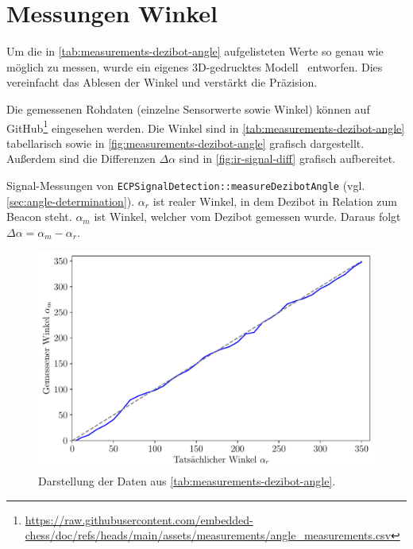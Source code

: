 
\section{Messungen Winkel}
\label{sec:measurements-dezibot-angle}

Um die in \autoref{tab:measurements-dezibot-angle} aufgelisteten Werte so genau wie möglich zu messen, wurde ein eigenes 3D\hyphen gedrucktes Modell~\cite{felttipDezibotAlignmentPointer2025} entworfen. Dies vereinfacht das Ablesen der Winkel und verstärkt die Präzision.

Die gemessenen Rohdaten (einzelne Sensorwerte sowie Winkel) können auf GitHub\footnote{\url{https://raw.githubusercontent.com/embedded-chess/doc/refs/heads/main/assets/measurements/angle_measurements.csv}} eingesehen werden. Die Winkel sind in \autoref{tab:measurements-dezibot-angle} tabellarisch sowie in \autoref{fig:measurements-dezibot-angle} grafisch dargestellt. Außerdem sind die Differenzen $\Delta\alpha$ sind in \autoref{fig:ir-signal-diff} grafisch aufbereitet.

\begin{table}[h!]
    \centering
    
    \caption{Signal-Messungen von \texttt{ECP\-Signal\-Detection::measure\-Dezibot\-Angle} (vgl. \autoref{sec:angle-determination}). $\alpha_r$ ist realer Winkel, in dem Dezibot in Relation zum Beacon steht. $\alpha_m$ ist Winkel, welcher vom Dezibot gemessen wurde. Daraus folgt $\Delta\alpha=\alpha_m - \alpha_r$.}
    \label{tab:measurements-dezibot-angle}
\end{table}

\begin{figure}[h]
    \centering
    \includegraphics[width=\textwidth]{../plot/ir_signal_comparison.pdf}
    \caption{Darstellung der Daten aus \autoref{tab:measurements-dezibot-angle}.}
    \label{fig:measurements-dezibot-angle}
\end{figure}


